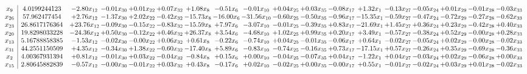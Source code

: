\documentclass[9pt]{article}
\begin{document}
 \[\begin{array}{c| c c@{\hskip 2pt} c@{\hskip 2pt} c@{\hskip 2pt} c@{\hskip 2pt} c@{\hskip 2pt} c@{\hskip 2pt} c@{\hskip 2pt} c@{\hskip 2pt} c@{\hskip 2pt} c@{\hskip 2pt} c@{\hskip 2pt} c@{\hskip 2pt} c@{\hskip 2pt} c@{\hskip 2pt} c@{\hskip 2pt} c@{\hskip 2pt} }
 x_{9}   &  4.0199244123 & -2.80 x_{12} & -0.01 x_{30} & +  0.01 x_{22} & +  0.07 x_{32} & +  1.08 x_{8} & -0.51 x_{6} & -0.01 x_{10} & +  0.04 x_{25} & +  0.03 x_{35} & -0.08 x_{17} & +  1.32 x_{1} & -0.13 x_{27} & -0.05 x_{24} & +  0.01 x_{29} & -0.01 x_{28} & -0.03 x_{33}\\
 x_{26}   &  57.962477454 & +  2.76 x_{12} & -1.37 x_{30} & +  2.02 x_{22} & -0.42 x_{32} & -15.73 x_{8} & -16.00 x_{6} & -31.56 x_{10} & -0.60 x_{25} & -0.50 x_{35} & -0.96 x_{17} & -15.35 x_{1} & -0.59 x_{27} & -0.47 x_{24} & -0.72 x_{29} & -0.27 x_{28} & -0.62 x_{33}\\
 x_{23}   &  26.8617176364 & + 23.76 x_{12} & -0.09 x_{30} & -0.15 x_{22} & -0.83 x_{32} & -15.59 x_{8} & +  7.97 x_{6} & -3.07 x_{10} & -0.01 x_{25} & -0.39 x_{35} & +  0.83 x_{17} & -21.69 x_{1} & +  1.45 x_{27} & +  0.36 x_{24} & +  0.23 x_{29} & -0.42 x_{28} & +  0.40 x_{33}\\
 x_{20}   &  19.8298033228 & -24.36 x_{12} & +  0.50 x_{30} & -0.12 x_{22} & +  0.46 x_{32} & + 26.37 x_{8} & +  3.54 x_{6} & -4.68 x_{10} & +  1.02 x_{25} & +  0.99 x_{35} & +  0.20 x_{17} & +  3.49 x_{1} & -0.57 x_{27} & -0.38 x_{24} & +  0.52 x_{29} & -0.00 x_{28} & +  0.28 x_{33}\\
 x_{13}   &  5.16788858385 & -1.53 x_{12} & -0.02 x_{30} & -0.00 x_{22} & +  0.06 x_{32} & +  0.61 x_{8} & -0.22 x_{6} & -0.74 x_{10} & +  0.04 x_{25} & -0.01 x_{35} & -0.06 x_{17} & +  0.64 x_{1} & -0.02 x_{27} & -0.05 x_{24} & +  0.02 x_{29} & -0.00 x_{28} & -0.02 x_{33}\\
 x_{31}   &  44.2551150509 & +  4.35 x_{12} & -0.34 x_{30} & +  1.38 x_{22} & -0.60 x_{32} & -17.40 x_{8} & +  5.89 x_{6} & -0.83 x_{10} & -0.74 x_{25} & -0.16 x_{35} & +  0.73 x_{17} & -17.15 x_{1} & +  0.57 x_{27} & -0.26 x_{24} & +  0.35 x_{29} & -0.69 x_{28} & -0.36 x_{33}\\
 x_{2}   &  4.00367931394 & +  0.81 x_{12} & -0.01 x_{30} & +  0.03 x_{22} & -0.04 x_{32} & -0.84 x_{8} & +  0.15 x_{6} & +  0.00 x_{10} & -0.04 x_{25} & -0.07 x_{35} & +  0.04 x_{17} & -1.22 x_{1} & +  0.04 x_{27} & -0.03 x_{24} & +  0.02 x_{29} & -0.06 x_{28} & +  0.00 x_{33}\\
 x_{15}   &  2.80645882839 & -0.57 x_{12} & -0.00 x_{30} & -0.01 x_{22} & +  0.03 x_{32} & +  0.43 x_{8} & -0.17 x_{6} & +  0.02 x_{10} & -0.02 x_{25} & +  0.00 x_{35} & -0.00 x_{17} & +  0.55 x_{1} & -0.01 x_{27} & -0.02 x_{24} & +  0.03 x_{29} & +  0.01 x_{28} & -0.02 x_{33}\\

\end{array}\]
\end{document}
